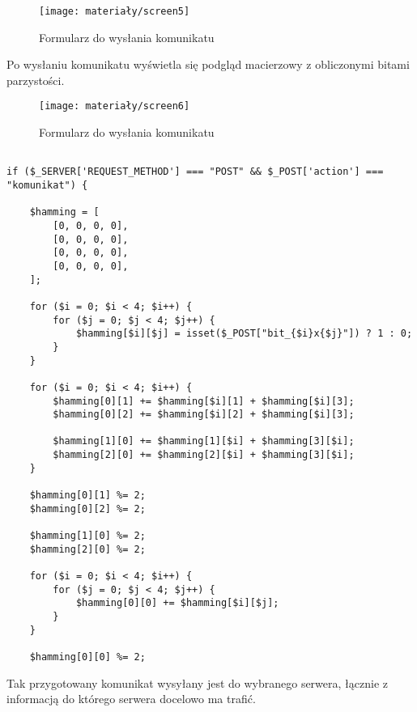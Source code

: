 \begin{figure}[H]
	\centering
	\vspace{-10pt}
	\texttt{[image: materiały/screen5]}
	\caption{Formularz do wysłania komunikatu}
\end{figure}

Po wysłaniu komunikatu wyświetla się podgląd macierzowy z obliczonymi bitami parzystości. 

\begin{figure}[H]
	\centering
	\vspace{-10pt}
	\texttt{[image: materiały/screen6]}
	\caption{Formularz do wysłania komunikatu}
\end{figure}

\begin{empty}
	\begin{verbatim}
    
if ($_SERVER['REQUEST_METHOD'] === "POST" && $_POST['action'] === "komunikat") {
	
	$hamming = [
		[0, 0, 0, 0],
		[0, 0, 0, 0],
		[0, 0, 0, 0],
		[0, 0, 0, 0],
	];
	
	for ($i = 0; $i < 4; $i++) {
		for ($j = 0; $j < 4; $j++) {
			$hamming[$i][$j] = isset($_POST["bit_{$i}x{$j}"]) ? 1 : 0;
		}
	}
	
	for ($i = 0; $i < 4; $i++) {
		$hamming[0][1] += $hamming[$i][1] + $hamming[$i][3];
		$hamming[0][2] += $hamming[$i][2] + $hamming[$i][3];
		
		$hamming[1][0] += $hamming[1][$i] + $hamming[3][$i];
		$hamming[2][0] += $hamming[2][$i] + $hamming[3][$i];
	}
	
	$hamming[0][1] %= 2;
	$hamming[0][2] %= 2;
	
	$hamming[1][0] %= 2;
	$hamming[2][0] %= 2;
	
	for ($i = 0; $i < 4; $i++) {
		for ($j = 0; $j < 4; $j++) {
			$hamming[0][0] += $hamming[$i][$j];
		}
	}
	
	$hamming[0][0] %= 2;
	\end{verbatim}
	\vspace{-10pt}
\end{empty}

\vspace{20pt}
Tak przygotowany komunikat wysyłany jest do wybranego serwera, łącznie z informacją do którego serwera docelowo ma trafić. 

